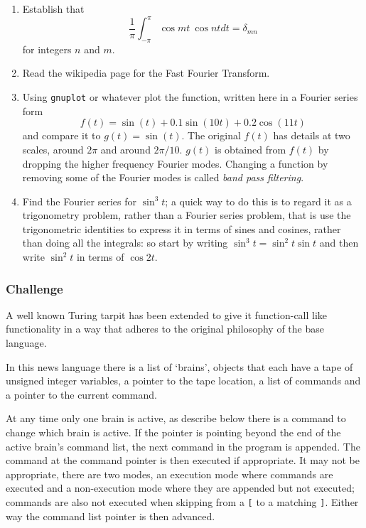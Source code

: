 \documentclass[12pt]{article}
\begin{document}
\begin{enumerate}


\item Establish that
\begin{equation}
\frac{1}{\pi}\int^\pi_{-\pi} \cos mt ~\cos nt dt=\delta_{mn}
\end{equation}
for integers $n$ and $m$.

\item Read the wikipedia page for the Fast Fourier Transform.

\item Using \texttt{gnuplot} or whatever plot the function, written here in a Fourier series form
\begin{equation}
f(t)=\sin(t)+0.1\sin(10t)+0.2\cos(11t)
\end{equation}
and compare it to $g(t)=\sin(t)$. The original $f(t)$ has details at
two scales, around $2\pi$ and around $2\pi/10$. $g(t)$ is obtained
from $f(t)$ by dropping the higher frequency Fourier modes. Changing a
function by removing some of the Fourier modes is called \textsl{band
  pass filtering}.

\item Find the Fourier series for $\sin^3 t$; a quick way to do this is to regard it as a trigonometry problem, rather than a Fourier series problem, that is use the trigonometric identities to express it in terms of sines and cosines, rather than doing all the integrals: so start by writing $\sin^3 t=\sin^2 t \sin t$ and then write $\sin^2 t$ in terms of $\cos 2t$.


\end{enumerate}

\subsubsection*{Challenge}
A well known Turing tarpit has been extended to give it function-call
like functionality in a way that adheres to the original philosophy of
the base language.

In this news language there is a list of \lq{}brains\rq{}, objects
that each have a tape of unsigned integer variables, a pointer to the
tape location, a list of commands and a pointer to the current
command.

At any time only one brain is active, as describe below there is a command to change which brain is active. If the pointer is pointing
beyond the end of the active brain's command list, the next command in the
program is appended. The command at the command pointer is then
executed if appropriate. It may not be appropriate, there are two
modes, an execution mode where commands are executed and a
non-execution mode where they are appended but not executed; commands
are also not executed when skipping from a \texttt{[} to a matching
  \texttt{]}. Either way the command list pointer is then advanced.
\end{document}
